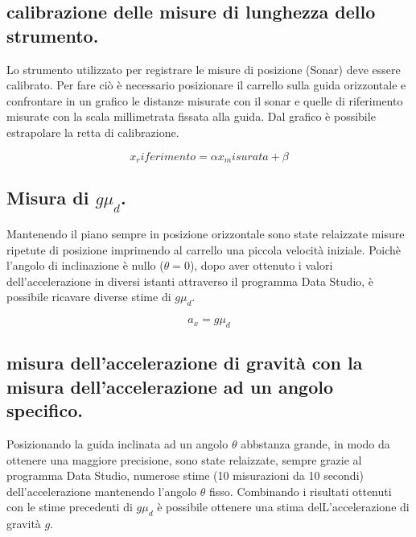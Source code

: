 \documentclass[10pt,oneside,a4paper]{article}
\begin{document}
\subsection{calibrazione delle misure di lunghezza dello strumento.}
Lo strumento utilizzato per registrare le misure di posizione (Sonar) deve essere calibrato. Per fare ciò è necessario posizionare il carrello sulla guida orizzontale e confrontare in un grafico le distanze misurate con il sonar e quelle di riferimento misurate con la scala millimetrata fissata alla guida. Dal grafico è possibile estrapolare la retta di calibrazione.\newline
\begin{center}
	\begin{equation}\label{eq:rettacalibrazione}
	x_riferimento=\alpha x_misurata+ \beta
	\end{equation}
\end{center}


\subsection{Misura di $g\mu_d$.}
Mantenendo il piano sempre in posizione orizzontale sono state relaizzate misure ripetute di posizione imprimendo al carrello una piccola velocità iniziale. Poichè l'angolo di inclinazione è nullo ($\theta=0$), dopo aver ottenuto i valori dell'accelerazione in diversi istanti attraverso il programma Data Studio, è possibile ricavare diverse stime di $g\mu_d$. 
\begin{center}
	\begin{equation}\label{eq:accelerazione1}
	a_x=g\mu_d
	\end{equation}
\end{center}

\subsection{misura dell'accelerazione di gravità con la misura dell'accelerazione ad un angolo specifico.}
Posizionando la guida inclinata ad un angolo $\theta$ abbstanza grande, in modo da ottenere una maggiore precisione, sono state relaizzate, sempre grazie al programma Data Studio, numerose stime (10 misurazioni da 10 secondi) dell'accelerazione mantenendo l'angolo $\theta$ fisso. Combinando i risultati ottenuti con le stime precedenti di $g\mu_d$ è possibile ottenere una stima delL'accelerazione di gravità $g$. 
\end{document}
